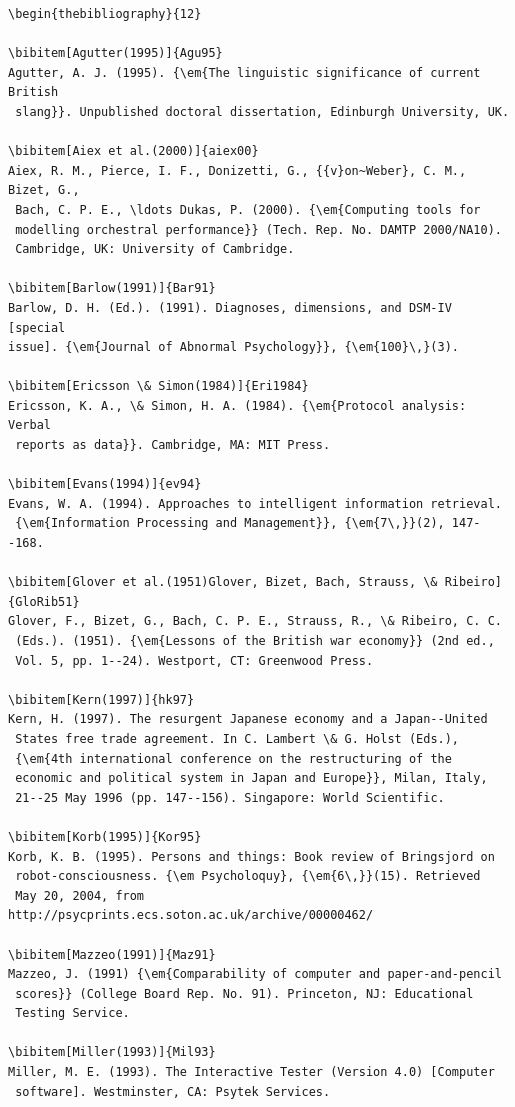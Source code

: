 \documentclass{tATO2e}
\begin{document}
\begin{verbatim}
\begin{thebibliography}{12}

\bibitem[Agutter(1995)]{Agu95}
Agutter, A. J. (1995). {\em{The linguistic significance of current British
 slang}}. Unpublished doctoral dissertation, Edinburgh University, UK.

\bibitem[Aiex et al.(2000)]{aiex00}
Aiex, R. M., Pierce, I. F., Donizetti, G., {{v}on~Weber}, C. M., Bizet, G.,
 Bach, C. P. E., \ldots Dukas, P. (2000). {\em{Computing tools for
 modelling orchestral performance}} (Tech. Rep. No. DAMTP 2000/NA10).
 Cambridge, UK: University of Cambridge.

\bibitem[Barlow(1991)]{Bar91}
Barlow, D. H. (Ed.). (1991). Diagnoses, dimensions, and DSM-IV [special
issue]. {\em{Journal of Abnormal Psychology}}, {\em{100}\,}(3).

\bibitem[Ericsson \& Simon(1984)]{Eri1984}
Ericsson, K. A., \& Simon, H. A. (1984). {\em{Protocol analysis: Verbal
 reports as data}}. Cambridge, MA: MIT Press.

\bibitem[Evans(1994)]{ev94}
Evans, W. A. (1994). Approaches to intelligent information retrieval.
 {\em{Information Processing and Management}}, {\em{7\,}}(2), 147--168.

\bibitem[Glover et al.(1951)Glover, Bizet, Bach, Strauss, \& Ribeiro]{GloRib51}
Glover, F., Bizet, G., Bach, C. P. E., Strauss, R., \& Ribeiro, C. C.
 (Eds.). (1951). {\em{Lessons of the British war economy}} (2nd ed.,
 Vol. 5, pp. 1--24). Westport, CT: Greenwood Press.

\bibitem[Kern(1997)]{hk97}
Kern, H. (1997). The resurgent Japanese economy and a Japan--United
 States free trade agreement. In C. Lambert \& G. Holst (Eds.),
 {\em{4th international conference on the restructuring of the
 economic and political system in Japan and Europe}}, Milan, Italy,
 21--25 May 1996 (pp. 147--156). Singapore: World Scientific.

\bibitem[Korb(1995)]{Kor95}
Korb, K. B. (1995). Persons and things: Book review of Bringsjord on
 robot-consciousness. {\em Psycholoquy}, {\em{6\,}}(15). Retrieved
 May 20, 2004, from http://psycprints.ecs.soton.ac.uk/archive/00000462/

\bibitem[Mazzeo(1991)]{Maz91}
Mazzeo, J. (1991) {\em{Comparability of computer and paper-and-pencil
 scores}} (College Board Rep. No. 91). Princeton, NJ: Educational
 Testing Service.

\bibitem[Miller(1993)]{Mil93}
Miller, M. E. (1993). The Interactive Tester (Version 4.0) [Computer
 software]. Westminster, CA: Psytek Services.


\end{verbatim}
\end{document}
